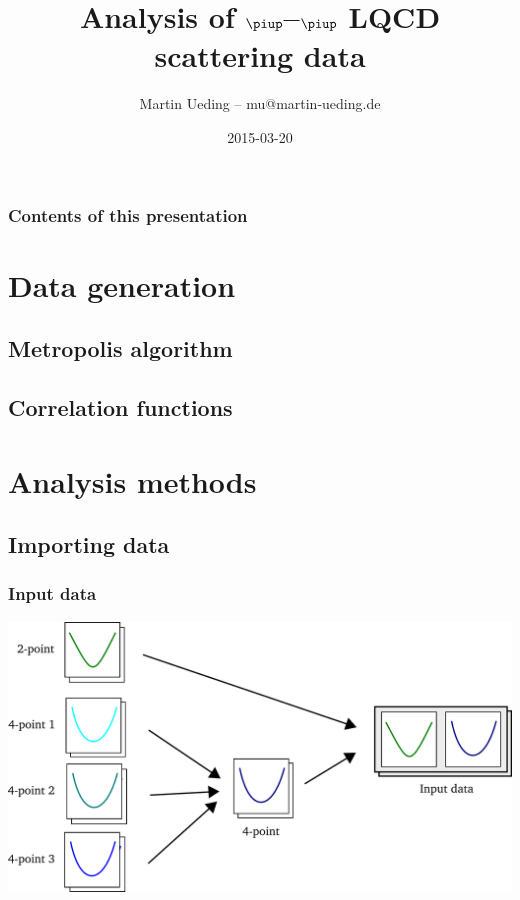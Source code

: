 \documentclass[english, fleqn]{beamer}
\title{Analysis of $\piup$--$\piup$ LQCD scattering data}
\author{Martin Ueding – mu@martin-ueding.de}
\date{2015-03-20}
\begin{document}
\begin{frame}
    \titlepage
\end{frame}

\begin{frame}
    \frametitle{Contents of this presentation}
    \tableofcontents
\end{frame}


\section{Data generation}

\subsection{Metropolis algorithm}

\subsection{Correlation functions}


\section{Analysis methods}

\newcommand\scale{0.2}

\subsection{Importing data}

\begin{frame}
    \frametitle{Input data}
    \begin{center}
        \includegraphics[scale=\scale]{sketches/01-input.pdf}
    \end{center}
\end{frame}
\end{document}
